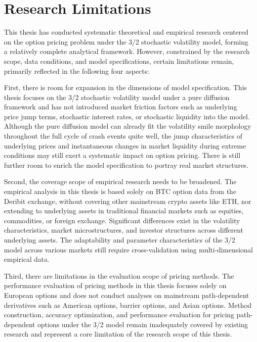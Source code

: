 \section{Research Limitations}

This thesis has conducted systematic theoretical and empirical research centered on the option pricing problem under the 3/2 stochastic volatility model, forming a relatively complete analytical framework. However, constrained by the research scope, data conditions, and model specifications, certain limitations remain, primarily reflected in the following four aspects:

First, there is room for expansion in the dimensions of model specification. This thesis focuses on the 3/2 stochastic volatility model under a pure diffusion framework and has not introduced market friction factors such as underlying price jump terms, stochastic interest rates, or stochastic liquidity into the model. Although the pure diffusion model can already fit the volatility smile morphology throughout the full cycle of crash events quite well, the jump characteristics of underlying prices and instantaneous changes in market liquidity during extreme conditions may still exert a systematic impact on option pricing. There is still further room to enrich the model specification to portray real market structures.

Second, the coverage scope of empirical research needs to be broadened. The empirical analysis in this thesis is based solely on BTC option data from the Deribit exchange, without covering other mainstream crypto assets like ETH, nor extending to underlying assets in traditional financial markets such as equities, commodities, or foreign exchange. Significant differences exist in the volatility characteristics, market microstructures, and investor structures across different underlying assets. The adaptability and parameter characteristics of the 3/2 model across various markets still require cross-validation using multi-dimensional empirical data.

Third, there are limitations in the evaluation scope of pricing methods. The performance evaluation of pricing methods in this thesis focuses solely on European options and does not conduct analyses on mainstream path-dependent derivatives such as American options, barrier options, and Asian options. Method construction, accuracy optimization, and performance evaluation for pricing path-dependent options under the 3/2 model remain inadequately covered by existing research and represent a core limitation of the research scope of this thesis.


